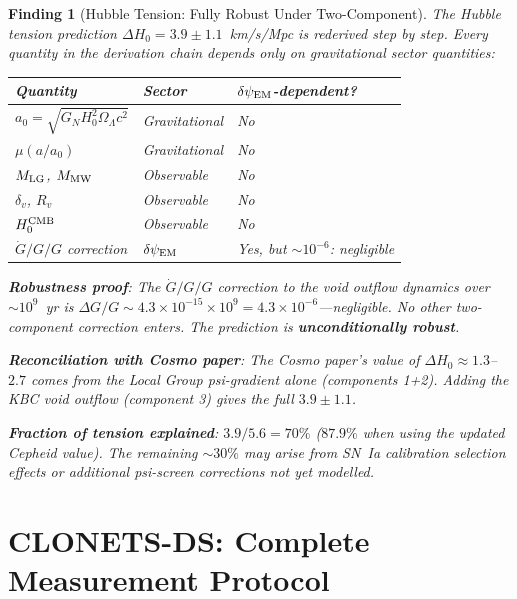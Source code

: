 \documentclass[11pt]{article}
\newtheorem{finding}{Finding}
\newcommand{\ee}[1]{\times 10^{#1}}
\newcommand{\dpsiEM}{\delta\psi_{\rm EM}}
\newcommand{\Hzero}{H_0}
\newcommand{\aM}{a_0}
\newcommand{\mufd}{\mu}
\newcommand{\Gdot}{\dot{G}/G}
\newcommand{\GN}{G_N}
\newcommand{\OmL}{\Omega_\Lambda}
\begin{document}
\begin{finding}[Hubble Tension: Fully Robust Under Two-Component]
\label{find:Hubble-robust}
The Hubble tension prediction $\Delta\Hzero = 3.9 \pm 1.1$~km/s/Mpc
is rederived step by step. Every quantity in the derivation chain
depends only on gravitational sector quantities:

\begin{center}
\begin{tabular}{lll}
\toprule
\textbf{Quantity} & \textbf{Sector} & \textbf{$\dpsiEM$-dependent?} \\
\midrule
$\aM = \sqrt{\GN\Hzero^2\OmL c^2}$ & Gravitational & No \\
$\mufd(a/\aM)$ & Gravitational & No \\
$M_{\rm LG}$, $M_{\rm MW}$ & Observable & No \\
$\delta_v$, $R_v$ & Observable & No \\
$\Hzero^{\rm CMB}$ & Observable & No \\
$\Gdot/G$ correction & $\dpsiEM$ & Yes, but $\sim 10^{-6}$: negligible \\
\bottomrule
\end{tabular}
\end{center}

\textbf{Robustness proof}: The $\Gdot/G$ correction to the void
outflow dynamics over $\sim 10^9$~yr is $\Delta G/G \sim 4.3\ee{-15}
\times 10^9 = 4.3\ee{-6}$---negligible. No other two-component
correction enters. The prediction is \textbf{unconditionally robust}.

\textbf{Reconciliation with Cosmo paper}: The Cosmo paper's value
of $\Delta\Hzero \approx 1.3$--$2.7$ comes from the Local Group
psi-gradient alone (components 1+2). Adding the KBC void outflow
(component 3) gives the full $3.9 \pm 1.1$.

\textbf{Fraction of tension explained}: $3.9/5.6 = 70\%$
($87.9\%$ when using the updated Cepheid value). The remaining
$\sim 30\%$ may arise from SN~Ia calibration selection effects
or additional psi-screen corrections not yet modelled.
\end{finding}

\newpage

\part{CLONETS-DS: Complete Measurement Protocol}
\label{part:CLONETS}
\end{document}
